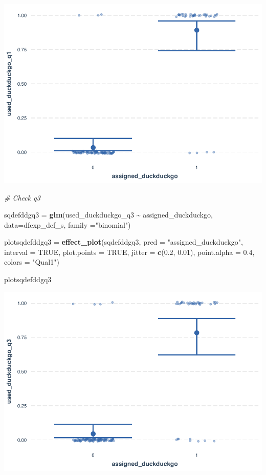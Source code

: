 \documentclass[
  11pt,
]{article}
\newenvironment{Shaded}{\begin{snugshade}}{\end{snugshade}}
\newcommand{\AttributeTok}[1]{\textcolor[rgb]{0.13,0.29,0.53}{#1}}
\newcommand{\CommentTok}[1]{\textcolor[rgb]{0.56,0.35,0.01}{\textit{#1}}}
\newcommand{\ConstantTok}[1]{\textcolor[rgb]{0.56,0.35,0.01}{#1}}
\newcommand{\FloatTok}[1]{\textcolor[rgb]{0.00,0.00,0.81}{#1}}
\newcommand{\FunctionTok}[1]{\textcolor[rgb]{0.13,0.29,0.53}{\textbf{#1}}}
\newcommand{\NormalTok}[1]{#1}
\newcommand{\OtherTok}[1]{\textcolor[rgb]{0.56,0.35,0.01}{#1}}
\newcommand{\SpecialCharTok}[1]{\textcolor[rgb]{0.81,0.36,0.00}{\textbf{#1}}}
\newcommand{\StringTok}[1]{\textcolor[rgb]{0.31,0.60,0.02}{#1}}
\begin{document}
\includegraphics{analysis-July19_files/figure-latex/unnamed-chunk-22-1.pdf}

\begin{Shaded}
\begin{Highlighting}[]
\CommentTok{\# Check q3}

\NormalTok{sqdefddgq3 }\OtherTok{=} \FunctionTok{glm}\NormalTok{(used\_duckduckgo\_q3 }\SpecialCharTok{\textasciitilde{}}\NormalTok{ assigned\_duckduckgo, }\AttributeTok{data=}\NormalTok{dfexp\_def\_s, }\AttributeTok{family =}\StringTok{"binomial"}\NormalTok{)}

\NormalTok{plotsqdefddgq3 }\OtherTok{=} \FunctionTok{effect\_plot}\NormalTok{(sqdefddgq3, }\AttributeTok{pred =} \StringTok{"assigned\_duckduckgo"}\NormalTok{, }\AttributeTok{interval =} \ConstantTok{TRUE}\NormalTok{, }\AttributeTok{plot.points =} \ConstantTok{TRUE}\NormalTok{, }\AttributeTok{jitter =} \FunctionTok{c}\NormalTok{(}\FloatTok{0.2}\NormalTok{, }\FloatTok{0.01}\NormalTok{), }\AttributeTok{point.alpha =} \FloatTok{0.4}\NormalTok{, }\AttributeTok{colors =} \StringTok{"Qual1"}\NormalTok{)}

\NormalTok{plotsqdefddgq3}
\end{Highlighting}
\end{Shaded}

\includegraphics{analysis-July19_files/figure-latex/unnamed-chunk-22-2.pdf}
\end{document}
